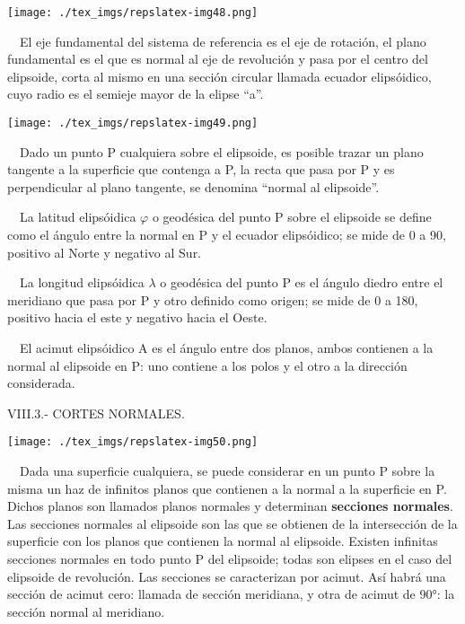 \documentclass{tufte-book}
\begin{document}
\begin{marginfigure}
\texttt{[image: ./tex\_imgs/repslatex-img48.png]}
\end{marginfigure}
 

\ \ El eje fundamental del sistema de referencia es el eje de
rotación, el plano fundamental es el que es normal al eje de
revolución y pasa por el centro del elipsoide, corta al mismo en una
sección circular llamada ecuador elipsóidico, cuyo radio es el
semieje mayor de la elipse {\textquotedblleft}a{\textquotedblright}.

\begin{marginfigure}
\texttt{[image: ./tex\_imgs/repslatex-img49.png]}
\end{marginfigure}
 

\ \ Dado un punto P cualquiera sobre el elipsoide, es posible trazar un
plano tangente a la superficie que contenga a P, la recta que pasa por
P y es perpendicular al plano tangente, se denomina
{\textquotedblleft}normal al elipsoide{\textquotedblright}.

\ \ La latitud elipsóidica  ${\varphi }$ o geodésica del punto P
sobre el elipsoide se define como el ángulo entre la normal en P y el
ecuador elipsóidico; se mide de 0 a 90{\textordmasculine}, positivo
al Norte y negativo al Sur.

\ \ La longitud elipsóidica  ${\lambda }$ o geodésica del punto P es
el ángulo diedro entre el meridiano que pasa por P y otro definido
como origen; se mide de 0 a 180{\textordmasculine}, positivo hacia el
este y negativo hacia el Oeste.

\ \ El acimut elipsóidico A es el ángulo entre dos planos, ambos
contienen a la normal al elipsoide en P: uno contiene a los polos y el
otro a la dirección considerada.

VIII.3.- CORTES NORMALES.

\begin{marginfigure}
\texttt{[image: ./tex\_imgs/repslatex-img50.png]}
\end{marginfigure}
 

\ \ Dada una superficie cualquiera, se puede considerar en un punto P
sobre la misma un haz de infinitos planos que contienen a la normal a
la superficie en P. Dichos planos son llamados planos normales y
determinan \textbf{secciones normales}.
Las secciones normales al elipsoide son las que se obtienen de la
intersección de la superficie con los planos que contienen la normal
al elipsoide. Existen infinitas secciones normales en todo punto P del
elipsoide; todas son elipses en el caso del elipsoide de revolución.
Las secciones se caracterizan por acimut. Así habrá una sección
de acimut cero: llamada de sección meridiana, y otra de acimut de
90°: la sección normal al meridiano.
\end{document}
